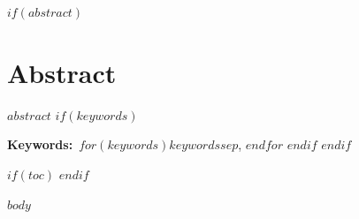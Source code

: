 \documentclass[english,12pt,a4paper,oneside]{article}
\begin{document}

$if(abstract)$
\section*{Abstract}
$abstract$
$if(keywords)$

\vspace{0.6em}\noindent\textbf{Keywords:}~$for(keywords)$$keywords$$sep$, $endfor$
$endif$
$endif$

$if(toc)$
\clearpage
\tableofcontents
$endif$

\clearpage
{}
\setcounter{page}{1}

$body$
\end{document}
